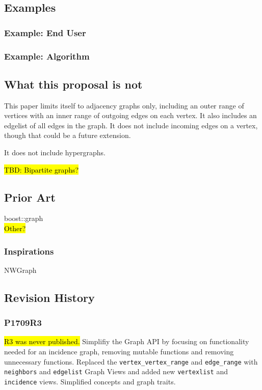 \documentclass[10pt,onecolumn]{article}
\newcommand{\tcode}[1]{\lstinline[breaklines=true]{#1}}
\begin{document}
\subsection{Examples}
\subsubsection{Example: End User}
\subsubsection{Example: Algorithm}

\subsection{What this proposal is  \textbf{not}}
This paper limits itself to adjacency graphs only, including an outer range of vertices with an inner range of outgoing edges on each vertex. It also includes an edgelist of all edges in the graph. It does not include incoming edges on a vertex, though that could be a future extension.

It does not include hypergraphs.

\hl{TBD: Bipartite graphs?}

\subsection{Prior Art}
boost::graph \\
\hl{Other?}

\subsubsection{Inspirations}
NWGraph

\subsection{Revision History}
\subsubsection*{P1709R3}
\hl{R3 was never published.}
Simplifiy the Graph API by focusing on functionality needed for an incidence graph, removing mutable functions and removing unnecessary functions. Replaced the \tcode{vertex_vertex_range} and \tcode{edge_range} with \tcode{neighbors} and \tcode{edgelist} Graph Views and added new \tcode{vertexlist} and \tcode{incidence} views. Simplified concepts and graph traits.
\end{document}
